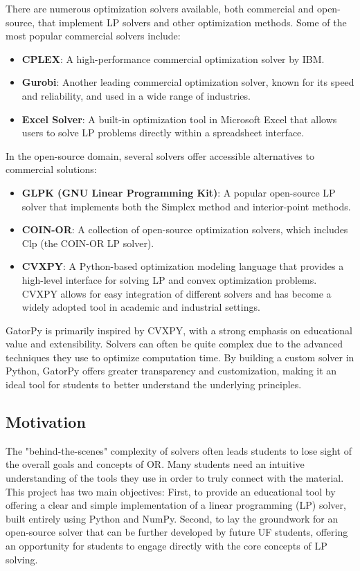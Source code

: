 \documentclass[conference]{IEEEtran}
\begin{document}
There are numerous optimization solvers available, both commercial and open-source, that implement LP solvers and other optimization methods. 
Some of the most popular commercial solvers include:
\begin{itemize}
    \item \textbf{CPLEX}: A high-performance commercial optimization solver by IBM.
    \item \textbf{Gurobi}: Another leading commercial optimization solver, known for its speed and reliability, and used in a wide range of industries.
    \item \textbf{Excel Solver}: A built-in optimization tool in Microsoft Excel that allows users to solve LP problems directly within a spreadsheet interface. 
\end{itemize}

In the open-source domain, several solvers offer accessible alternatives to commercial solutions:
\begin{itemize}
    \item \textbf{GLPK (GNU Linear Programming Kit)}: A popular open-source LP solver that implements both the Simplex method and interior-point methods.
    \item \textbf{COIN-OR}: A collection of open-source optimization solvers, which includes Clp (the COIN-OR LP solver).
    \item \textbf{CVXPY}: A Python-based optimization modeling language that provides a high-level interface for solving LP and convex optimization problems. 
    CVXPY allows for easy integration of different solvers and has become a widely adopted tool in academic and industrial settings.
\end{itemize}

GatorPy is primarily inspired by CVXPY, with a strong emphasis on educational value and extensibility. 
Solvers can often be quite complex due to the advanced techniques they use to optimize computation time. 
By building a custom solver in Python, GatorPy offers greater transparency and customization, making it an ideal tool for students to better understand the underlying principles.



\subsection{Motivation}
The "behind-the-scenes" complexity of solvers often leads students to lose sight of the overall goals and concepts of OR. Many students need an intuitive understanding of the tools they use in order to truly connect with the material. 
This project has two main objectives: First, to provide an educational tool by offering a clear and simple implementation of a linear programming (LP) solver, built entirely using Python and NumPy. 
Second, to lay the groundwork for an open-source solver that can be further developed by future UF students, offering an opportunity for students to engage directly with the core concepts of LP solving.
\end{document}
